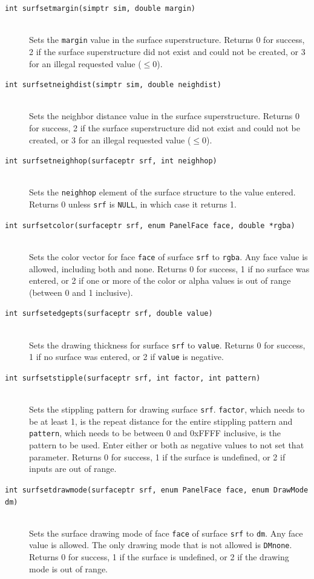\documentclass {scrbook}
\newcommand {\ttt} {\texttt}
\begin{document}
\begin{description}
\item[\ttt{int surfsetmargin(simptr sim, double margin)}]
\hfill \\
Sets the \ttt{margin} value in the surface superstructure. Returns 0 for success, 2 if the surface superstructure did not exist and could not be created, or 3 for an illegal requested value ($\leq 0$).

\item[\ttt{int surfsetneighdist(simptr sim, double neighdist)}]
\hfill \\
Sets the neighbor distance value in the surface superstructure. Returns 0 for success, 2 if the surface superstructure did not exist and could not be created, or 3 for an illegal requested value ($\leq 0$).

\item[\ttt{int surfsetneighhop(surfaceptr srf, int neighhop)}]
\hfill \\
Sets the \ttt{neighhop} element of the surface structure to the value entered. Returns 0 unless \ttt{srf} is \ttt{NULL}, in which case it returns 1.

\item[\ttt{int surfsetcolor(surfaceptr srf, enum PanelFace face, double *rgba)}]
\hfill \\
Sets the color vector for face \ttt{face} of surface \ttt{srf} to \ttt{rgba}. Any face value is allowed, including both and none. Returns 0 for success, 1 if no surface was entered, or 2 if one or more of the color or alpha values is out of range (between 0 and 1 inclusive).

\item[\ttt{int surfsetedgepts(surfaceptr srf, double value)}]
\hfill \\
Sets the drawing thickness for surface \ttt{srf} to \ttt{value}. Returns 0 for success, 1 if no surface was entered, or 2 if \ttt{value} is negative.

\item[\ttt{int surfsetstipple(surfaceptr srf, int factor, int pattern)}]
\hfill \\
Sets the stippling pattern for drawing surface \ttt{srf}. \ttt{factor}, which needs to be at least 1, is the repeat distance for the entire stippling pattern and \ttt{pattern}, which needs to be between 0 and 0xFFFF inclusive, is the pattern to be used. Enter either or both as negative values to not set that parameter. Returns 0 for success, 1 if the surface is undefined, or 2 if inputs are out of range.

\item[\ttt{int surfsetdrawmode(surfaceptr srf, enum PanelFace face, enum DrawMode dm)}]
\hfill \\
Sets the surface drawing mode of face \ttt{face} of surface \ttt{srf} to \ttt{dm}. Any face value is allowed. The only drawing mode that is not allowed is \ttt{DMnone}. Returns 0 for success, 1 if the surface is undefined, or 2 if the drawing mode is out of range.


\end{description}
\end{document}
